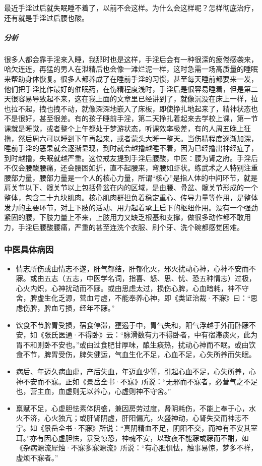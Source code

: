 \begin{case}
    最近手淫过后就失眠睡不着了，以前不会这样。为什么会这样呢？怎样彻底治疗，还有就是手淫过后腰也酸。
    \subparagraph{分析} 很多人都会靠手淫来入睡，我那时也是这样，手淫后会有一种很深的疲倦感袭来，哈欠连连，再猛的男人在泄精后也会像一滩烂泥一样，这时急需一场高质量的睡眠来帮助身体恢复。很多人都养成了在睡前手淫的习惯，甚至每天睡前都要来一发，他们把手淫比作最好的催眠药，在伤精程度浅时，手淫后是很容易睡着，但是第二天很容易导致起不来，这在我上面的文章里已经讲到了，就像沉没在床上一样，拉也拉不起，拽也拽不动，就像深深地嵌入了床板，即使挣扎地起来了，精神状态也不是很好，甚至很差。有的孩子睡前手淫，第二天挣扎着起来去学校上课，第一节课就是睡觉，或者整个上午都处于梦游状态，听课效率极差，有的人周五晚上狂撸，然后周六可以睡到下午再起来，或者蒙头大睡一整天。当伤精程度逐渐加深，睡前手淫的恶果就会逐渐显现，到时就会越撸越睡不着，因为已经撸出神经症了，到时越撸，失眠就越严重。这位戒友提到手淫后腰酸，中医：腰为肾之府。手淫后不仅会腰酸腰痛，还会腰困如折，直不起腰来，弯腰如虾状。练武术之人特别注重腰部力量，腰部力量是一个人的核心力量，所谓“核心”是指人体的中间环节，就是肩关节以下、髋关节以上包括骨盆在内的区域，是由腰、骨盆、髋关节形成的一个整体，包含二十九块肌肉。核心肌肉群担负着稳定重心、传导力量等作用，是整体发力的主要环节，对上下肢的活动、用力起着承上启下的枢纽作用。没有一个强劲紧固的腰，下肢力量上不来，上肢用力又缺乏根基和支撑，做很多动作都不敢用力，手淫后腰酸腰痛，严重的甚至连洗个衣服、刷个牙、洗个碗都感觉困难。
\end{case}

\subsubsection{中医具体病因}

\begin{itemize}
    \item 情志所伤或由情志不遂，肝气郁结，肝郁化火，邪火扰动心神，心神不安而不寐。或由五志（五志，中医学名词，指喜、怒、思、忧、恐五种情志）过极，心火内炽，心神扰动而不寐。或由思虑太过，损伤心脾，心血暗耗，神不守舍，脾虚生化乏源，营血亏虚，不能奉养心神，即《类证治裁·不寐》曰：“思虑伤脾，脾血亏损，经年不寐。”
    \item 饮食不节脾胃受损，宿食停滞，壅遏于中，胃气失和，阳气浮越于外而卧寐不安，如《张氏医通·不得卧》云：“脉滑数有力不得卧者，中有宿滞痰火，此为胃不和则卧不安也。”或由过食肥甘厚味，酿生痰热，扰动心神而不眠。或由饮食不节，脾胃受伤，脾失健运，气血生化不足，心血不足，心失所养而失眠。
    \item 病后、年迈久病血虚，产后失血，年迈血少等，引起心血不足，心失所养，心神不安而不寐。正如《景岳全书·不寐》所说：“无邪而不寐者，必营气之不足也，营主血，血虚则无以养心，心虚则神不守舍。”
    \item 禀赋不足，心虚胆怯素体阴盛，兼因房劳过度，肾阴耗伤，不能上奉于心，水火不济，心火独亢；或肝肾阴虚，肝阳偏亢，火盛神动，心肾失交而神志不宁。如《景岳全书·不寐》所说：“真阴精血不足，阴阳不交，而神有不安其室耳。”亦有因心虚胆怯，暴受惊恐，神魂不安，以致夜不能寐或寐而不酣，如《杂病源流犀烛·不寐多寐源流》所说：“有心胆惧怯，触事易惊，梦多不祥，虚烦不寐者。”
\end{itemize}

